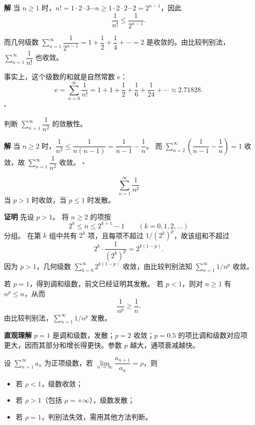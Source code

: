 \documentclass[fontset=fandol]{ctexart}
\newenvironment{custom}[1]{\par\noindent\textbf{#1}\quad}{\par\vspace{0.8em}}
\newenvironment{solution}{\par\noindent\textbf{解}\quad}{\hfill$\square$\par\vspace{0.8em}}
\newenvironment{intuition}{\par\noindent\textbf{直观理解}\quad}{\par\vspace{0.8em}}
\newcommand{\ee}{\mathrm{e}}
\begin{document}
\begin{solution}
当 \(n \geq 1\) 时，\(n! = 1 \cdot 2 \cdot 3 \cdots n \geq 1 \cdot 2 \cdot 2 \cdots 2 = 2^{n-1}\)，因此
\[
\dfrac{1}{n!} \leq \dfrac{1}{2^{n-1}}.
\]

而几何级数 \(\sum\limits_{n = 1}^{  \infty } \dfrac{1}{2^{n-1}} = 1 + \dfrac12 + \dfrac14 + \cdots = 2\) 是收敛的。由比较判别法，\(\sum\limits_{n = 1}^{  \infty } \dfrac{1}{n!}\) 也收敛。

事实上，这个级数的和就是自然常数 \(\ee\)：
\[
\ee = \sum_{n=0}^{\infty} \dfrac{1}{n!} = 1 + 1 + \dfrac12 + \dfrac16 + \dfrac{1}{24} + \cdots \approx 2.71828.
\]
\end{solution}

\begin{example}
判断 \(\sum\limits_{n = 1}^{  \infty } \dfrac{1}{n^2}\) 的敛散性。
\end{example}
\begin{solution}
当 \(n \geq 2\) 时，\(\dfrac{1}{n^2} \leq \dfrac{1}{n(n-1)} = \dfrac{1}{n-1} - \dfrac{1}{n}\)。
而 \(\sum\limits_{n = 2}^{  \infty } \left(\dfrac{1}{n-1} - \dfrac{1}{n}\right) = 1\) 收敛，故 \(\sum\limits_{n = 1}^{  \infty } \dfrac{1}{n^2}\) 收敛。
\end{solution}

\begin{example}[\(p\)-级数]
\[
\sum_{n=1}^{\infty} \dfrac{1}{n^p}
\]
当 \(p > 1\) 时收敛，当 \(p \leq 1\) 时发散。
\end{example}

\begin{custom}{证明}
先设 $p>1$。 将 $n\ge2$ 的项按
\[
2^k\le n\le 2^{k+1}-1\qquad(k=0,1,2,\ldots)
\]
分组。 在第 $k$ 组中共有 $2^k$ 项，且每项不超过 $1/(2^k)^p$，故该组和不超过
\[
2^k\cdot \frac{1}{(2^k)^p}=2^{k(1-p)}.
\]
因为 $p>1$，几何级数 $\sum\limits_{k = 0}^{  \infty }2^{k(1-p)}$ 收敛，由比较判别法知 $\sum\limits_{n = 1}^{  \infty } 1/n^p$ 收敛。

若 $p=1$，得到调和级数，前文已经证明其发散。 若 $p<1$，则对 $n\ge1$ 有 $n^p\le n$，从而
\[
\frac1{n^p}\ge \frac1n.
\]
由比较判别法，$\sum\limits_{n = 1}^{  \infty } 1/n^p$ 发散。
\end{custom}

\begin{intuition}
\(p=1\) 是调和级数，发散；\(p=2\) 收敛；\(p=0.5\) 的项比调和级数对应项更大，因而其部分和增长得更快。参数 \(p\) 越大，通项衰减越快。
\end{intuition}

\begin{theorem}
设 \(\sum\limits_{n = 1}^{  \infty }a_n\) 为正项级数，若 \(\lim\limits_{n\to\infty}\dfrac{a_{n+1}}{a_n}=\rho\)，则
\begin{itemize}
\item 若 \(\rho < 1\)，级数收敛；
\item 若 \(\rho > 1\)（包括 \(\rho = +\infty\)），级数发散；
\item 若 \(\rho = 1\)，判别法失效，需用其他方法判断。
\end{itemize}
\end{theorem}
\end{document}
